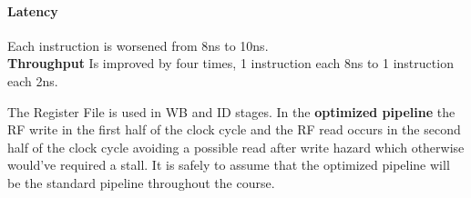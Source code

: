 \paragraph{Latency} Each instruction is worsened from 8ns to 10ns.\\
\textbf{Throughput} Is improved by four times, 1 instruction each 8ns to 1 instruction each 2ns.


The Register File is used in WB and ID stages.
In the \textbf{optimized pipeline} the RF write in the first half of the clock cycle and the RF read occurs in the
second half of the clock cycle avoiding a possible read after write hazard which otherwise would've required a stall.
It is safely to assume that the optimized pipeline will be the standard pipeline throughout the course.